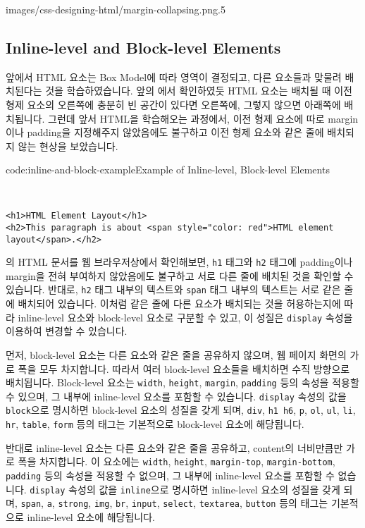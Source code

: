     {images/css-designing-html/margin-collapsing.png}{.5}

\subsection*{Inline-level and Block-level Elements}
앞에서 HTML 요소는 Box Model에 따라 영역이 결정되고, 다른 요소들과 맞물려 배치된다는 것을 학습하였습니다. 앞의 에서 확인하였듯 HTML 요소는 배치될 때 이전 형제 요소의 오른쪽에 충분히 빈 공간이 있다면 오른쪽에, 그렇지 않으면 아래쪽에 배치됩니다. 그런데 앞서 HTML을 학습해오는 과정에서, 이전 형제 요소에 따로 margin이나 padding을 지정해주지 않았음에도 불구하고 이전 형제 요소와 같은 줄에 배치되지 않는 현상을 보았습니다. 

\begin{codeenv}{code:inline-and-block-example}{Example of Inline-level, Block-level Elements}\begin{verbatim}


<h1>HTML Element Layout</h1>
<h2>This paragraph is about <span style="color: red">HTML element layout</span>.</h2>
\end{verbatim}
\end{codeenv}

의 HTML 문서를 웹 브라우저상에서 확인해보면, \texttt{h1} 태그와 \texttt{h2} 태그에 padding이나 margin을 전혀 부여하지 않았음에도 불구하고 서로 다른 줄에 배치된 것을 확인할 수 있습니다. 반대로, \texttt{h2} 태그 내부의 텍스트와 \texttt{span} 태그 내부의 텍스트는 서로 같은 줄에 배치되어 있습니다. 이처럼 같은 줄에 다른 요소가 배치되는 것을 허용하는지에 따라 inline-level 요소와 block-level 요소로 구분할 수 있고, 이 성질은 \texttt{display} 속성을 이용하여 변경할 수 있습니다. 

먼저, block-level 요소는 다른 요소와 같은 줄을 공유하지 않으며, 웹 페이지 화면의 가로 폭을 모두 차지합니다. 따라서 여러 block-level 요소들을 배치하면 수직 방향으로 배치됩니다. Block-level 요소는 \texttt{width}, \texttt{height}, \texttt{margin}, \texttt{padding} 등의 속성을 적용할 수 있으며, 그 내부에 inline-level 요소를 포함할 수 있습니다. \texttt{display} 속성의 값을 \texttt{block}으로 명시하면 block-level 요소의 성질을 갖게 되며, \texttt{div}, \texttt{h1}~\texttt{h6}, \texttt{p}, \texttt{ol}, \texttt{ul}, \texttt{li}, \texttt{hr}, \texttt{table}, \texttt{form} 등의 태그는 기본적으로 block-level 요소에 해당됩니다. 

반대로 inline-level 요소는 다른 요소와 같은 줄을 공유하고, content의 너비만큼만 가로 폭을 차지합니다. 이 요소에는 \texttt{width}, \texttt{height}, \texttt{margin-top}, \texttt{margin-bottom}, \texttt{padding} 등의 속성을 적용할 수 없으며, 그 내부에 inline-level 요소를 포함할 수 없습니다. \texttt{display} 속성의 값을 \texttt{inline}으로 명시하면 inline-level 요소의 성질을 갖게 되며, \texttt{span}, \texttt{a}, \texttt{strong}, \texttt{img}, \texttt{br}, \texttt{input}, \texttt{select}, \texttt{textarea}, \texttt{button} 등의 태그는 기본적으로 inline-level 요소에 해당됩니다. 

